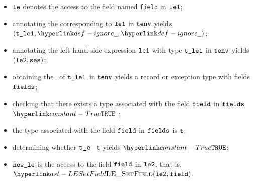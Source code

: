 \ProseParagraph
\AllApply
\begin{itemize}
  \item $\vle$ denotes the access to the field named \texttt{field} in $\vleone$;
  \item annotating the \rhsexpression{} corresponding to $\vleone$ in $\tenv$ yields \\ $(\vtleone, \Ignore, \Ignore)$\ProseOrTypeError;
  \item annotating the left-hand-side expression  $\vleone$ with type $\vtleone$ in $\tenv$ yields \\ $(\vletwo, \vses)$\ProseOrTypeError;
  \item obtaining the \underlyingtype\ of $\vtleone$ in $\tenv$ yields a record
    or exception type with fields $\fields$\ProseOrTypeError;
  \item checking that there exists a type associated with the field $\vfield$ in $\fields$ $\True$ \ProseTerminateAs{\BadField};
  \item the type associated with the field $\vfield$ in $\fields$ is $\vt$;
  \item determining whether $\vte$ \typesatisfies\ $\vt$ yields $\True$\ProseOrTypeError;
  \item $\newle$ is the access to the field $\vfield$ in $\vletwo$, that is, $\LESetField(\vletwo, \vfield)$.
\end{itemize}

\FormallyParagraph
\begin{mathpar}
\end{mathpar}

